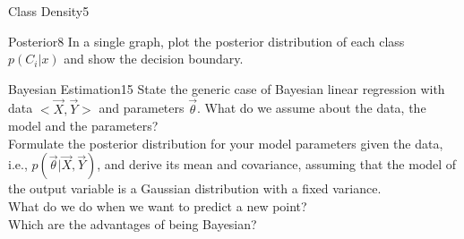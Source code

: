 \begin{questions}
\begin{question}{Class Density}{5}
\begin{answer}\end{answer}

\end{question}


\begin{question}{Posterior}{8}
In a single graph, plot the posterior distribution of each class $p(C_i|x)$ and show the decision boundary. 

\begin{answer}\end{answer}

\end{question}


\begin{question}[bonus]{Bayesian Estimation}{15}
State the generic case of Bayesian linear regression with data $<\vec X, \vec Y>$ and parameters $\vec \theta$. What do we assume about the data, the model and the parameters?\\
Formulate the posterior distribution for your model parameters given the data, i.e., $p(\vec \theta | \vec X, \vec Y)$, and derive its mean and covariance, assuming that the model of the output variable is a Gaussian distribution with a fixed variance.\\
What do we do when we want to predict a new point?\\
Which are the advantages of being Bayesian? 

\begin{answer}\end{answer}

\end{question}

\end{questions}
